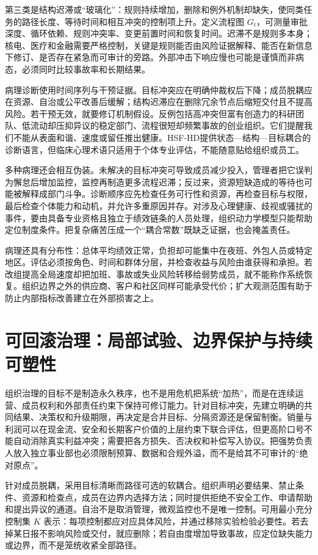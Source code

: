 第三类是结构迟滞或“玻璃化”：规则持续增加，删除和例外机制却缺失，使同类任务的路径长度、等待时间和相互冲突的控制项上升。定义流程图 $G_t$，可测量审批深度、循环依赖、规则冲突率、变更前置时间和恢复时间。迟滞不是规则多本身；核电、医疗和金融需要严格控制，关键是规则能否由风险证据解释、能否在新信息下修订、是否存在紧急而可审计的旁路。外部冲击下响应慢也可能是谨慎而非病态，必须同时比较事故率和长期结果。

病理诊断使用时间序列与干预证据。目标冲突应在明确仲裁权后下降；成员脱耦应在资源、自治或公平改善后缓解；结构迟滞应在删除冗余节点后缩短交付且不提高风险。若干预无效，就要修订机制假设。反例包括高冲突但富有创造力的科研团队、低流动却压抑异议的稳定部门、流程很短却频繁事故的创业组织。它们提醒我们不能从表面和谐、速度或留任推出健康。HSF-HD提供状态—结构—目标耦合的诊断语言，但临床心理术语只适用于个体专业评估，不能随意贴给组织或员工。

多种病理还会相互伪装。未解决的目标冲突可导致成员减少投入，管理者把它误判为懈怠后增加监控，监控再制造更多流程迟滞；反过来，资源短缺造成的等待也可能被解释成部门斗争。诊断顺序应先检查任务可行性和资源，再检查目标与权限，最后检查个体能力和动机，并允许多重原因并存。对涉及心理健康、歧视或骚扰的事件，要由具备专业资格且独立于绩效链条的人员处理，组织动力学模型只能帮助定位制度条件。把复杂痛苦压成一个“耦合常数”既缺乏证据，也会掩盖责任。

病理还具有分布性：总体平均绩效正常，负担却可能集中在夜班、外包人员或特定地区。评估必须按角色、时间和群体分层，并检查收益与风险由谁获得和承担。若改组提高全局速度却把加班、事故或失业风险转移给弱势成员，就不能称作系统恢复。组织边界之外的供应商、客户和社区同样可能承受代价；扩大观测范围有助于防止内部指标改善建立在外部损害之上。

\section{可回滚治理：局部试验、边界保护与持续可塑性}
\label{sec:org_governance_strategies}

组织治理的目标不是制造永久秩序，也不是用危机把系统“加热”，而是在连续运营、成员权利和外部责任约束下保持可修订能力。针对目标冲突，先建立明确的共同结果、决策权和升级期限，再决定是合并目标、分隔资源还是保留制衡。销量与利润可以在现金流、安全和长期客户价值的上层约束下联合评估，但更高阶口号不能自动消除真实利益冲突；需要把各方损失、否决权和补偿写入协议。把强势负责人放入独立事业部也必须限制预算、数据和合规外溢，而不是给其不可审计的“绝对原点”。

针对成员脱耦，采用目标清晰而路径可选的软耦合。组织声明必要结果、禁止条件、资源和检查点，成员在边界内选择方法；同时提供拒绝不安全工作、申请帮助和提出异议的通道。自治不是取消管理，微观监控也不是唯一控制。可用最小充分控制集 $K$ 表示：每项控制都应对应具体风险，并通过移除实验检验必要性。若去掉某日报不影响风险或交付，就应删除；若自由度增加导致事故，应定位缺失能力或边界，而不是笼统收紧全部路径。

